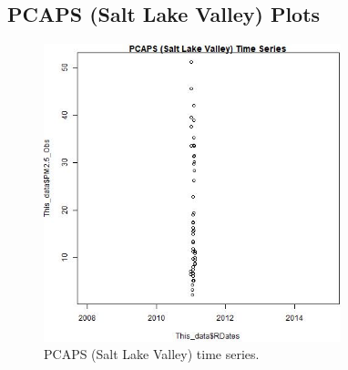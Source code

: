 
\subsection{PCAPS (Salt Lake Valley) Plots}
\begin{figure} 
\centering 
\includegraphics[width=0.77\textwidth]{Code_Outputs/PCAPS_time_series.jpg} 
\caption{\label{fig:PCAPSTS}PCAPS (Salt Lake Valley) time series.} 
\end{figure} 
 
